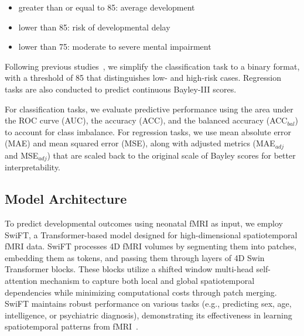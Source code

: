 \documentclass[runningheads,a4paper]{llncs}
\begin{document}
\begin{itemize}
    \item greater than or equal to 85: average development
    \item lower than 85: risk of developmental delay
    \item lower than 75: moderate to severe mental impairment~\cite{johnson2014using}
\end{itemize}

Following previous studies~\cite{he2020multi}, we simplify the classification task to a binary format, with a threshold of 85 that distinguishes low- and high-risk cases. Regression tasks are also conducted to predict continuous Bayley-III scores.

For classification tasks, we evaluate predictive performance using the area under the ROC curve (AUC), the accuracy (ACC), and the balanced accuracy (ACC$_{bal}$) to account for class imbalance. For regression tasks, we use mean absolute error (MAE) and mean squared error (MSE), along with adjusted metrics (MAE$_{adj}$ and MSE$_{adj}$) that are scaled back to the original scale of Bayley scores for better interpretability.

\subsection{Model Architecture}
\label{sec:model_architecture}
To predict developmental outcomes using neonatal fMRI as input, we employ SwiFT, a Transformer-based model designed for high-dimensional spatiotemporal fMRI data. SwiFT processes 4D fMRI volumes by segmenting them into patches, embedding them as tokens, and passing them through layers of 4D Swin Transformer blocks. These blocks utilize a shifted window multi-head self-attention mechanism to capture both local and global spatiotemporal dependencies while minimizing computational costs through patch merging. SwiFT maintains robust performance on various tasks (e.g., predicting sex, age, intelligence, or psychiatric diagnosis), demonstrating its effectiveness in learning spatiotemporal patterns from fMRI~\cite{kim2023swiftswin4dfmri}.
\end{document}
